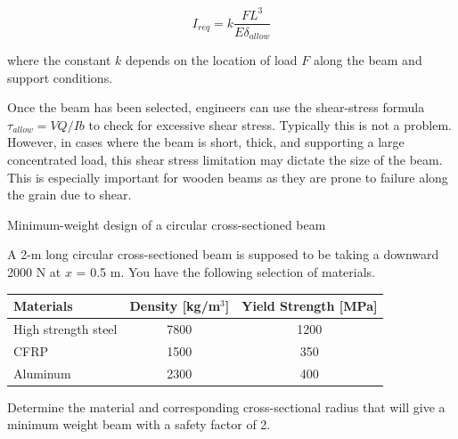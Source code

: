 \documentclass[
10pt,
a4paper,
openany,
svgnames,
]{book}
\begin{document}
\begin{equation}
  I_{req} = k \frac{FL^3}{E \delta_{allow}}
\end{equation}

where the constant $k$ depends on the location of load $F$ along the beam and support conditions.
  
Once the beam has been selected, engineers can use the shear-stress formula $\tau_{allow} = VQ/Ib$ to check for excessive shear stress. Typically this is not a problem. However, in cases where the beam is short, thick, and supporting a large concentrated load, this shear stress limitation may dictate the size of the beam. This is especially important for wooden beams as they are prone to failure along the grain due to shear.

\begin{example} Minimum-weight design of a circular cross-sectioned beam

  A 2-m long circular cross-sectioned beam is supposed to be taking a downward 2000 N at $x$ = 0.5 m. You have the following selection of materials.

  \begin{table}[H]
    \centering
    \begin{tabular}{lcc}
      \toprule
      Materials & Density [kg/m$^3$] & Yield Strength [MPa] \\
      \midrule
      High strength steel & 7800 & 1200 \\
      CFRP  & 1500 & 350 \\
      Aluminum & 2300 & 400 \\
      \bottomrule
    \end{tabular}
  \end{table}

  Determine the material and corresponding cross-sectional radius that will give a minimum weight beam with a safety factor of 2. 
  
\end{example}
\end{document}

